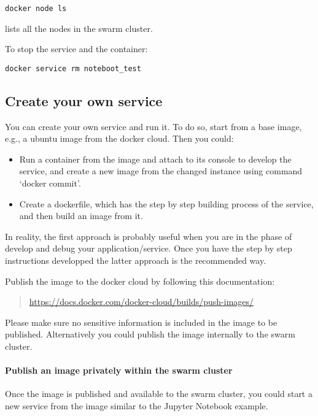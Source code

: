 \begin{verbatim}
docker node ls
\end{verbatim}

lists all the nodes in the swarm cluster.

To stop the service and the container:

\begin{verbatim}
docker service rm noteboot_test
\end{verbatim}


\subsection{Create your own service}\label{create-your-own-service}

You can create your own service and run it. To do so, start from a base
image, e.g., a ubuntu image from the docker cloud. Then you could:

\begin{itemize}

\item Run a container from the image and attach to its console to develop
the service, and create a new image from the changed instance using
command `docker commit'.

\item Create a dockerfile, which has the step by step building process of
the service, and then build an image from it.

\end{itemize}

In reality, the first approach is probably useful when you are in the
phase of develop and debug your application/service. Once you have the
step by step instructions developped the latter approach is the
recommended way.

Publish the image to the docker cloud by following this documentation:

\begin{quote}
\url{https://docs.docker.com/docker-cloud/builds/push-images/}
\end{quote}

Please make sure no sensitive information is included in the image to
be published. Alternatively you could publish the image internally to
the swarm cluster.

\paragraph{Publish an image privately within the swarm cluster}
\label{publish-an-image-privately-within-the-swarm-cluster}


Once the image is published and available to the swarm cluster, you
could start a new service from the image similar to the Jupyter Notebook
example.
